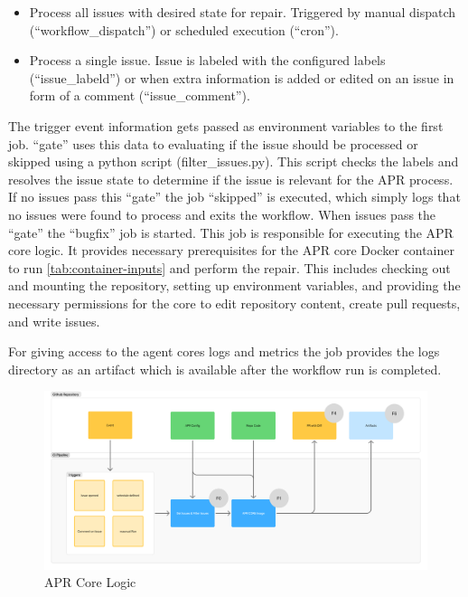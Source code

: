 \begin{itemize}
    \item Process all issues with desired state for repair. Triggered by manual dispatch (``workflow\_dispatch'') or scheduled execution (``cron'').
    \item Process a single issue. Issue is labeled with the configured labels (``issue\_labeld'') or when extra information is added or edited on an issue in form of a comment (``issue\_comment'').
\end{itemize}

The trigger event information gets passed as environment variables to the first job. ``gate'' uses this data to evaluating if the issue should be processed or skipped using a python script (filter\_issues.py). This script checks the labels and resolves the issue state to determine if the issue is relevant for the APR process. If no issues pass this ``gate'' the job ``skipped'' is executed, which simply logs that no issues were found to process and exits the workflow. When issues pass the ``gate'' the ``bugfix'' job is started.  This job is responsible for executing the APR core logic. It provides necessary prerequisites for the APR core Docker container to run \ref{tab:container-inputs} and perform the repair. This includes checking out and mounting the repository, setting up environment variables, and providing the necessary permissions for the core to edit repository content, create pull requests, and write issues.

For giving access to the agent cores logs and metrics the job provides the logs directory as an artifact which is available after the workflow run is completed.

\begin{figure}[H]
    \centering
    \includegraphics[width=1\textwidth]{images/flowcharts/ci.png}
    \caption{APR Core Logic}
    \label{fig:ci}
\end{figure}

